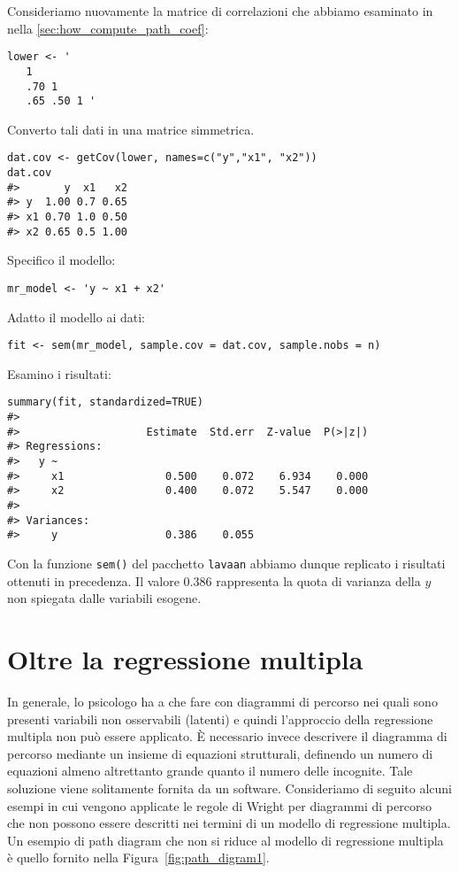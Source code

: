 \begin{exmp}
Consideriamo nuovamente la matrice di correlazioni che abbiamo esaminato in nella \ref{sec:how_compute_path_coef}: 

\begin{lstlisting}
lower <- '
   1
   .70 1
   .65 .50 1 '
\end{lstlisting}
Converto tali dati in una matrice simmetrica.
\begin{lstlisting}
dat.cov <- getCov(lower, names=c("y","x1", "x2"))
dat.cov
#>       y  x1   x2
#> y  1.00 0.7 0.65
#> x1 0.70 1.0 0.50
#> x2 0.65 0.5 1.00
\end{lstlisting}
Specifico il modello:
\begin{lstlisting}
mr_model <- 'y ~ x1 + x2'
\end{lstlisting}
Adatto il modello ai dati:
\begin{lstlisting}
fit <- sem(mr_model, sample.cov = dat.cov, sample.nobs = n)
\end{lstlisting}
Esamino i risultati:
\begin{lstlisting}
summary(fit, standardized=TRUE)
#> 
#>                    Estimate  Std.err  Z-value  P(>|z|)    
#> Regressions:
#>   y ~
#>     x1                0.500    0.072    6.934    0.000    
#>     x2                0.400    0.072    5.547    0.000     
#> 
#> Variances:
#>     y                 0.386    0.055                      
\end{lstlisting}
Con la funzione {\tt sem()} del pacchetto {\tt lavaan} abbiamo dunque replicato i risultati ottenuti in precedenza.
Il valore $0.386$ rappresenta la quota di varianza della $y$ non spiegata dalle variabili esogene.
\end{exmp}



\section{Oltre la regressione multipla}

In generale, lo psicologo ha a che fare con diagrammi di percorso nei quali sono presenti variabili non osservabili
 (latenti) e quindi l'approccio della regressione multipla non può essere applicato. 
È necessario invece descrivere il diagramma di percorso mediante un insieme di equazioni strutturali, definendo un numero di equazioni almeno altrettanto grande quanto il numero delle
  incognite. Tale soluzione viene solitamente fornita da un software.
Consideriamo di seguito alcuni esempi in cui vengono applicate
  le regole di Wright per diagrammi di percorso che non possono essere
  descritti nei termini di un modello di regressione multipla.  Un esempio di path diagram che non si riduce al modello di regressione multipla è quello fornito nella Figura~\ref{fig:path_digram1}.

